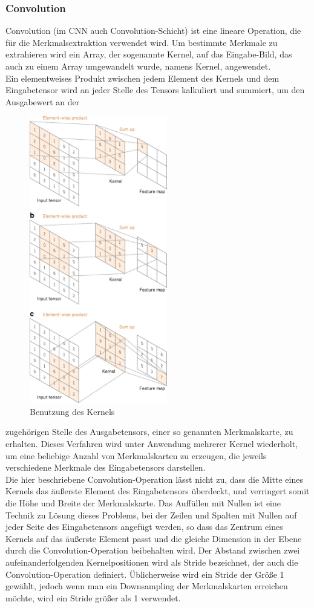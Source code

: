 \documentclass[paper=A4,pagesize=auto,12pt,headinclude=true,footinclude=true,BCOR=0mm,DIV=calc]{scrartcl}
\begin{document}
\subsubsection{Convolution}
Convolution (im CNN auch Convolution-Schicht) ist eine lineare Operation, die für die Merkmalsextraktion verwendet wird. Um bestimmte Merkmale zu extrahieren wird ein Array, der sogenannte Kernel, auf das Eingabe-Bild, das auch zu einem Array umgewandelt wurde, namens Kernel, angewendet.\\
Ein elementweises Produkt zwischen jedem Element des Kernels und dem Eingabetensor wird an jeder Stelle des Tensors kalkuliert und summiert, um den Ausgabewert an der  
\begin{figure}
	\centering
	\includegraphics[width=6cm]{"images/cnn.png"}
	\caption{Benutzung des Kernels \cite{cnn2}}
	\label{useofkernel}
\end{figure}
zugehörigen Stelle des Ausgabetensors, einer so genannten Merkmalskarte, zu erhalten.
Dieses Verfahren wird unter Anwendung mehrerer Kernel wiederholt, um eine beliebige Anzahl von Merkmalskarten zu erzeugen, die jeweils verschiedene Merkmale des Eingabetensors darstellen.\\
Die hier beschriebene Convolution-Operation lässt nicht zu, dass die Mitte eines Kernels das äußerste Element des Eingabetensors überdeckt, und verringert somit die Höhe und Breite der Merkmalskarte. Das Auffüllen mit Nullen ist eine Technik zu Lösung dieses Problems, bei der Zeilen und Spalten mit Nullen auf jeder Seite des Eingabetensors angefügt werden, so dass das Zentrum eines Kernels auf das äußerste Element passt und die gleiche Dimension in der Ebene durch die Convolution-Operation beibehalten wird. Der Abstand zwischen zwei aufeinanderfolgenden Kernelpositionen wird als Stride bezeichnet, der auch die Convolution-Operation definiert. Üblicherweise wird ein Stride der Größe 1 gewählt, jedoch wenn man ein Downsampling  der Merkmalskarten erreichen möchte, wird ein Stride größer als 1 verwendet.
\end{document}
